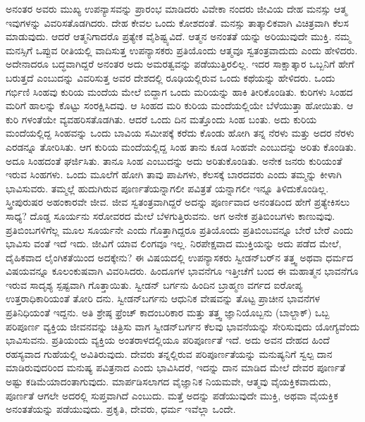 ಅನಂತರ ಅವರು ಮುಖ್ಯ ಉಪನ್ಯಾಸವನ್ನು ಪ್ರಾರಂಭ ಮಾಡಿದರು ವಿವೇಕಾ ನಂದರು ಜೀವಿಯ ದೇಹ ಮನಸ್ಸು ಆತ್ಮ ಇವುಗಳನ್ನು ವಿವರಿಸತೊಡಗಿದರು. ದೇಹ ಕೇವಲ ಒಂದು ಕೋಶದಂತೆ. ಮನಸ್ಸು ತಾತ್ಕಾಲಿಕವಾಗಿ ವಿಚಿತ್ರವಾಗಿ ಕೆಲಸ ಮಾಡುವುದು. ಆದರೆ ಆತ್ಮನಿಗಾದರೊ ಪ್ರತ್ಯೇಕ ವೈಶಿಷ್ಟ್ಯವಿದೆ. ಆತ್ಮನ ಅನಂತತೆ ಯನ್ನು ಅರಿಯುವುದೇ ಮುಕ್ತಿ. ನಮ್ಮ ಮನಸ್ಸಿಗೆ ಒಪ್ಪುವ ರೀತಿಯಲ್ಲಿ ವಾದಿಸುತ್ತ ಉಪನ್ಯಾಸಕರು ಪ್ರತಿಯೊಂದು ಆತ್ಮವೂ ಸ್ವತಂತ್ರವಾದುದು ಎಂದು ಹೇಳಿದರು. ಅದೇನಾದರೂ ಬದ್ಧವಾಗಿದ್ದರೆ ಅನಂತರ ಅದು ಅಮರತ್ವವನ್ನು ಪಡೆಯುತ್ತಿರಲಿಲ್ಲ. ಇದರ ಸಾಕ್ಷಾತ್ಕಾರ ಒಬ್ಬನಿಗೆ ಹೇಗೆ ಬರುತ್ತದೆ ಎಂಬುದನ್ನು ವಿವರಿಸುತ್ತ ಅವರ ದೇಶದಲ್ಲಿ ರೂಢಿಯಲ್ಲಿರುವ ಒಂದು ಕಥೆಯನ್ನು ಹೇಳಿದರು. ಒಂದು ಗರ್ಭಿಣಿ ಸಿಂಹವು ಕುರಿಯ ಮಂದೆಯ ಮೇಲೆ ಬಿದ್ದಾಗ ಒಂದು ಮರಿಯನ್ನು ಹಾಕಿ ತೀರಿಕೊಂಡಿತು. ಕುರಿಗಳು ಸಿಂಹದ ಮರಿಗೆ ಹಾಲನ್ನು ಕೊಟ್ಟು ಸಂರಕ್ಷಿಸಿದವು. ಆ ಸಿಂಹದ ಮರಿ ಕುರಿಯ ಮಂದೆಯಲ್ಲಿಯೇ ಬೆಳೆಯುತ್ತಾ ಹೋಯಿತು. ಆ ಕುರಿ ಗಳಂತೆಯೇ ವ್ಯವಹರಿಸತೊಡಗಿತು. ಆದರೆ ಒಂದು ದಿನ ಮತ್ತೊಂದು ಸಿಂಹ ಬಂತು. ಅದು ಕುರಿಯ ಮಂದೆಯಲ್ಲಿದ್ದ ಸಿಂಹವನ್ನು ಒಂದು ಬಾವಿಯ ಸಮೀಪಕ್ಕೆ ಕರೆದು ಕೊಂಡು ಹೋಗಿ ತನ್ನ ನೆರಳು ಮತ್ತು ಅದರ ನೆರಳು ಎರಡನ್ನೂ ತೋರಿಸಿತು. ಆಗ ಕುರಿಯ ಮಂದೆಯಲ್ಲಿದ್ದ ಸಿಂಹ ತಾನು ಕೂಡ ಸಿಂಹವೇ ಎಂಬುದನ್ನು ಅರಿತು ಕೊಂಡಿತು. ಅದೂ ಸಿಂಹದಂತೆ ಘರ್ಜಿಸಿತು. ತಾನೂ ಸಿಂಹ ಎಂಬುದನ್ನು ಅದು ಅರಿತುಕೊಂಡಿತು. ಅನೇಕ ಜನರು ಕುರಿಯಂತೆ ಇರುವ ಸಿಂಹಗಳು. ಒಂದು ಮೂಲೆಗೆ ಹೋಗಿ ತಾವು ಪಾಪಿಗಳು, ಕೆಲಸಕ್ಕೆ ಬಾರದವರು ಎಂದು ತಮ್ಮನ್ನು ಕೀಳಾಗಿ ಭಾವಿಸುವರು. ತಮ್ಮಲ್ಲೆ ಹುದುಗಿರುವ ಪೂರ್ಣತೆಯನ್ನಾಗಲೀ ಪವಿತ್ರತೆ ಯನ್ನಾಗಲೀ ಇನ್ನೂ ತಿಳಿದುಕೊಂಡಿಲ್ಲ. ಸ್ತ್ರೀಪುರುಷರ ಅಹಂಕಾರವೇ ಜೀವ. ಜೀವ ಸ್ವತಂತ್ರವಾಗಿದ್ದರೆ ಅದನ್ನು ಪೂರ್ಣವಾದ ಅನಂತದಿಂದ ಹೇಗೆ ಪ್ರತ್ಯೇಕಿಸಲು ಸಾಧ್ಯ? ದೊಡ್ಡ ಸೂರ್ಯನು ಸರೋವರದ ಮೇಲೆ ಬೆಳಗುತ್ತಿರುವನು. ಅಗ ಅನೇಕ ಪ್ರತಿಬಿಂಬಗಳು ಕಾಣುವುವು. ಪ್ರತಿಬಿಂಬಗಳಿಗೆಲ್ಲ ಮೂಲ ಸೂರ್ಯನೇ ಎಂದು ಗೊತ್ತಾಗಿದ್ದರೂ ಪ್ರತಿಯೊಂದು ಪ್ರತಿಬಿಂಬವನ್ನೂ ಬೇರೆ ಬೇರೆ ಎಂದು ಭಾವಿಸು ವಂತೆ ಇದೆ ಇದು. ಜೀವಿಗೆ ಯಾವ ಲಿಂಗವೂ ಇಲ್ಲ. ನಿರಪೇಕ್ಷವಾದ ಮುಕ್ತಿಯನ್ನು ಅದು ಪಡೆದ ಮೇಲೆ, ದೈಹಿಕವಾದ ಲೈಂಗಿಕತೆಯಿಂದ ಅದಕ್ಕೇನು? ಈ ವಿಷಯದಲ್ಲಿ ಉಪನ್ಯಾಸಕರು ಸ್ವೀಡನ್​ಬರ್​ನ ತತ್ತ್ವ ಅಥವಾ ಧರ್ಮದ ವಿಷಯವನ್ನೂ ಕೂಲಂಕುಷವಾಗಿ ವಿವರಿಸಿದರು. ಹಿಂದೂಗಳ ಭಾವನೆಗೂ ಇತ್ತೀಚೆಗೆ ಬಂದ ಈ ಮಹಾತ್ಮನ ಭಾವನೆಗೂ ಇರುವ ಸಾದೃಶ್ಯ ಸ್ಪಷ್ಟವಾಗಿ ಗೊತ್ತಾಯಿತು. ಸ್ವೀಡನ್​ ಬರ್ಗನು ಹಿಂದಿನ ಬ್ರಾಹ್ಮಣ ವರ್ಗದ ಐರೋಪ್ಯ ಉತ್ತರಾಧಿಕಾರಿಯಂತೆ ತೋರಿ ದನು. ಸ್ವೀಡನ್​ಬರ್ಗನು ಆಧುನಿಕ ವೇಷವನ್ನು ತೊಟ್ಟ ಪ್ರಾಚೀನ ಭಾವನೆಗಳ ಪ್ರತಿನಿಧಿಯಂತೆ ಇದ್ದನು. ಅತಿ ಶ್ರೇಷ್ಠ ಫ್ರೆಂಚ್​ ಕಾದಂಬರಿಕಾರ ಮತ್ತು ತತ್ತ್ವ ಜ್ಞಾನಿಯೊಬ್ಬನು (ಬಾಲ್ಜಾಕ್​) ಒಬ್ಬ ಪರಿಪೂರ್ಣ ವ್ಯಕ್ತಿಯ ಜೀವನವನ್ನು ಚಿತ್ರಿಸು ವಾಗ ಸ್ವೀಡನ್​ಬರ್ಗನ ಕೆಲವು ಭಾವನೆಯನ್ನು ಸೇರಿಸುವುದು ಯೋಗ್ಯವೆಂದು ಭಾವಿಸುವನು. ಪ್ರತಿಯಂದು ವ್ಯಕ್ತಿಯ ಅಂತರಾಳದಲ್ಲಿಯೂ ಪರಿಪೂರ್ಣತೆ ಇದೆ. ಅದು ಅವನ ದೇಹದ ಹಿಂದೆ ರಹಸ್ಯವಾದ ಗುಹೆಯಲ್ಲಿ ಅವಿತಿರುವುದು. ದೇವರು ತನ್ನಲ್ಲಿರುವ ಪರಿಪೂರ್ಣತೆಯನ್ನು ಮನುಷ್ಯನಿಗೆ ಸ್ವಲ್ಪ ದಾನ ಮಾಡಿರುವುದರಿಂದ ಮನುಷ್ಯ ಪವಿತ್ರನಾದ ಎಂದು ಭಾವಿಸಿದರೆ, ಇದನ್ನು ದಾನ ಮಾಡಿದ ಮೇಲೆ ದೇವರ ಪೂರ್ಣತೆ ಅಷ್ಟು ಕಡಿಮೆಯಾದಂತಾಗುವುದು. ಮಾರ್ಪಡಿಸಲಾಗದ ವೈಜ್ಞಾನಿಕ ನಿಯಮವೇ, ಆತ್ಮವು ವೈಯಕ್ತಿಕವಾದುದು, ಪೂರ್ಣತೆ ಆಗಲೇ ಅದರಲ್ಲಿ ಸುಪ್ತವಾಗಿದೆ ಎಂಬುದು. ಮತ್ತೆ ಅದನ್ನು ಪಡೆಯುವುದೇ ಮುಕ್ತಿ, ಅಥವಾ ವೈಯಕ್ತಿಕ ಅನಂತತೆಯನ್ನು ಪಡೆಯುವುದು. ಪ್ರಕೃತಿ, ದೇವರು, ಧರ್ಮ ಇವೆಲ್ಲಾ ಒಂದೇ.

